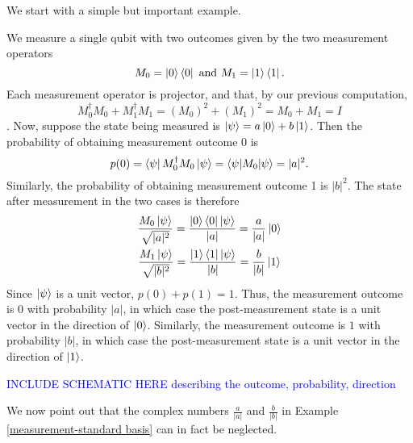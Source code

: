 {We start with a simple but important example.
\begin{example} \label{measurement-standard basis}
We measure a single qubit with two outcomes given by the two measurement operators 
$$M_0=\ket{0}\bra{0}\textrm{ and }M_1=\ket{1}\bra{1}.$$ 
Each measurement operator is projector, and that, by our previous computation,
\begin{equation*}
    M_0^\dagger M_0+M_1^\dagger M_1 = (M_0)^2+(M_1)^2=M_0 + M_1 = I
\end{equation*}.
Now, suppose the state being measured is $\ket{\psi}=a\ket{0}+b\ket{1}$. Then the probability of obtaining measurement outcome 0 is
\begin{equation*}
    p(0) = \bra{\psi}M_0^\dagger M_0 \ket{\psi} = \braket{\psi | M_0 | \psi}=|a|^2.
\end{equation*}
Similarly, the probability of obtaining measurement outcome 1 is $|b|^2$.
The state after measurement in the two cases is therefore
\begin{gather*}
    \frac{M_0 \ket{\psi}}{\sqrt{|a|^2}}=\frac{\ket{0}\bra{0}\ket{\psi}}{|a|}=\frac{a}{|a|}\ket{0}\\
    \frac{M_1 \ket{\psi}}{\sqrt{|b|^2}}=\frac{\ket{1}\bra{1}\ket{\psi}}{|b|}=\frac{b}{|b|}\ket{1}\\   
\end{gather*}
Since $\ket{\psi}$ is a unit vector, $p(0)+p(1)=1$.  Thus, the measurement outcome is $0$ with probability $|a|$, in which case the post-measurement state is a unit vector in the direction of $\ket{0}$.  Similarly, the measurement outcome is $1$ with probability $|b|$, in which case the post-measurement state is a unit vector in the direction of $\ket{1}$.
\end{example}

\textcolor{blue}{INCLUDE SCHEMATIC HERE describing the outcome, probability, direction}

We now point out that the complex numbers $\frac{a}{|a|}$ and $\frac{b}{|b|}$ in Example \ref{measurement-standard basis} can in fact be neglected. 

}
